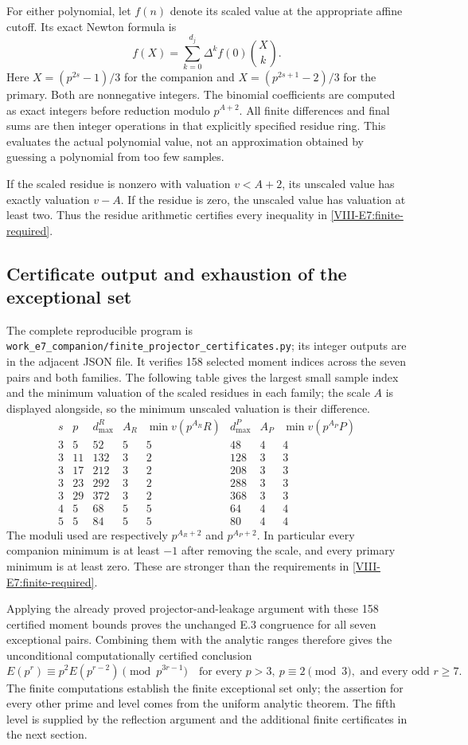 \documentclass[11pt,letterpaper]{article}
\numberwithin{equation}{section}
\begin{document}
For either polynomial, let $f(n)$ denote its scaled value at the
appropriate affine cutoff. Its exact Newton formula is
\[
 f(X)=\sum_{k=0}^{d_j}\Delta^kf(0)\binom Xk.
\]
Here $X=(p^{2s}-1)/3$ for the companion and
$X=(p^{2s+1}-2)/3$ for the primary. Both are nonnegative integers.
The binomial coefficients are computed as exact integers before
reduction modulo $p^{A+2}$. All finite differences and final sums are
then integer operations in that explicitly specified residue ring.
This evaluates the actual polynomial value, not an approximation
obtained by guessing a polynomial from too few samples.

If the scaled residue is nonzero with valuation $v<A+2$, its unscaled
value has exactly valuation $v-A$. If the residue is zero, the
unscaled value has valuation at least two. Thus the residue arithmetic
certifies every inequality in \eqref{VIII-E7:finite-required}.

\subsection{Certificate output and exhaustion of the exceptional set}
The complete reproducible program is
\nolinkurl{work_e7_companion/finite_projector_certificates.py}; its
integer outputs are in the adjacent JSON file. It verifies 158 selected
moment indices across the seven pairs and both families. The following
table gives the largest small sample index and the minimum valuation
of the scaled residues in each family; the scale $A$ is displayed
alongside, so the minimum unscaled valuation is their difference.
\[
\begin{array}{c|c|r|c|r|r|c|r}
s&p&d_{\max}^R&A_R&\min v(p^{A_R}R)&d_{\max}^P&A_P&\min v(p^{A_P}P)\\\hline
3&5 &52 &5&5&48 &4&4\\
3&11&132&3&2&128&3&3\\
3&17&212&3&2&208&3&3\\
3&23&292&3&2&288&3&3\\
3&29&372&3&2&368&3&3\\
4&5 &68 &5&5&64 &4&4\\
5&5 &84 &5&5&80 &4&4
\end{array}
\]
The moduli used are respectively $p^{A_R+2}$ and $p^{A_P+2}$.
In particular every companion minimum is at least $-1$ after removing
the scale, and every primary minimum is at least zero. These are
stronger than the requirements in \eqref{VIII-E7:finite-required}.

Applying the already proved projector-and-leakage argument with these
158 certified moment bounds proves the unchanged E.3 congruence for
all seven exceptional pairs. Combining them with the analytic ranges
therefore gives the unconditional computationally certified conclusion
\[
 \boxed{E(p^r)\equiv p^2E(p^{r-2})\pmod{p^{3r-1}}
 \quad\text{for every }p>3,\ p\equiv2\pmod3,
 \text{ and every odd }r\ge7.}
\]
The finite computations establish the finite exceptional set only;
the assertion for every other prime and level comes from the uniform
analytic theorem. The fifth level is supplied by the reflection argument and the
additional finite certificates in the next section.
\end{document}
